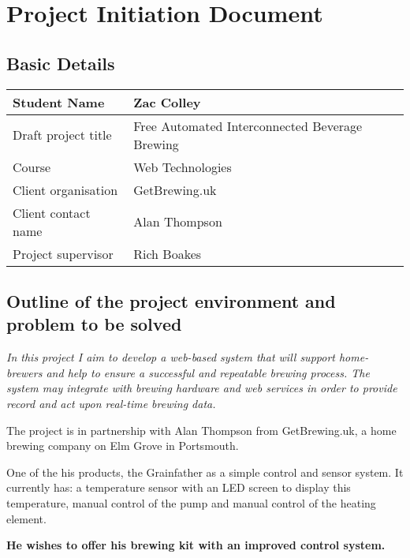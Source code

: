 \chapter{Project Initiation Document} \label{appendix:pid}

\section{Basic Details}

\begin{table}[h]
\centering
\begin{tabular}{|l|l|}
\hline
Student Name        & Zac Colley                                     \\ \hline
Draft project title & Free Automated Interconnected Beverage Brewing \\ \hline
Course              & Web Technologies                               \\ \hline
Client organisation & GetBrewing.uk                                  \\ \hline
Client contact name & Alan Thompson                                  \\ \hline
Project supervisor  & Rich Boakes                                    \\ \hline
\end{tabular}
\end{table}

\section{Outline of the project environment and problem to be solved}

\textit{In this project I aim to develop a web-based system that will support home-brewers and help to ensure a successful and repeatable brewing process. The system may integrate with brewing hardware and web services in order to provide record and act upon real-time brewing data.}

The project is in partnership with Alan Thompson from GetBrewing.uk, a home brewing company on Elm Grove in Portsmouth.

One of the his products, the Grainfather as a simple control and sensor system. It currently has: a temperature sensor with an LED screen to display this temperature, manual control of the pump and manual control of the heating element.

\textbf{He wishes to offer his brewing kit with an improved control system.}


